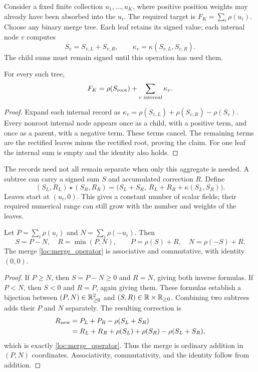 Consider a fixed finite collection $u_1,\ldots,u_K$, where positive
position weights may already have been absorbed into the $u_i$. The required
target is $F_K=\sum_i\rho(u_i)$. Choose any binary merge tree. Each leaf
retains its signed value; each internal node $v$ computes
\[
 S_v=S_{v,L}+S_{v,R},\qquad
 \kappa_v=\kappa(S_{v,L},S_{v,R}).
\]
The child sums must remain signed until this operation has used them.

\begin{theorem}
\label{loc:telescoping}
For every such tree,
\begin{equation}
 F_K=\rho(S_{\rm root})+
          \sum_{v\text{ internal}}\kappa_v.
 \label{loc:telescope_equation}
\end{equation}
\end{theorem}
\begin{proof}
Expand each internal record as
$\kappa_v=\rho(S_{v,L})+\rho(S_{v,R})-\rho(S_v)$.
Every nonroot internal node appears once as a child, with a positive term,
and once as a parent, with a negative term. These terms cancel. The remaining
terms are the rectified leaves minus the rectified root, proving the claim.
For one leaf the internal sum is empty and the identity also holds.
\end{proof}

The records need not all remain separate when only this aggregate is needed.
A subtree can carry a signed sum $S$ and accumulated correction $R$. Define
\begin{equation}
 (S_L,R_L)\star(S_R,R_R)=
 \bigl(S_L+S_R,\ R_L+R_R+\kappa(S_L,S_R)\bigr).
 \label{loc:merge_operator}
\end{equation}
Leaves start at $(u_i,0)$. This gives a constant number of scalar fields;
their required numerical range can still grow with the number and weights
of the leaves.

\begin{proposition}
\label{loc:mass_coordinates}
Let $P=\sum_i\rho(u_i)$ and $N=\sum_i\rho(-u_i)$. Then
\begin{equation}
 S=P-N,\quad R=\min(P,N),\qquad
 P=\rho(S)+R,\quad N=\rho(-S)+R.
 \label{loc:mass_inverse}
\end{equation}
The merge \eqref{loc:merge_operator} is associative and commutative, with
identity $(0,0)$.
\end{proposition}
\begin{proof}
If $P\ge N$, then $S=P-N\ge0$ and $R=N$, giving both inverse formulas.
If $P<N$, then $S<0$ and $R=P$, again giving them. These formulas establish a
bijection between $(P,N)\in\mathbb R_{\ge0}^2$ and $(S,R)\in\mathbb R\times\mathbb R_{\ge0}$.
Combining two subtrees adds their $P$ and $N$ separately. The resulting
correction is
\begin{align*}
 R_{\rm new}
 &=P_L+P_R-\rho(S_L+S_R)\\
 &=R_L+R_R+\rho(S_L)+\rho(S_R)-\rho(S_L+S_R),
\end{align*}
which is exactly \eqref{loc:merge_operator}. Thus the merge is ordinary
addition in $(P,N)$ coordinates. Associativity, commutativity, and the
identity follow from addition.
\end{proof}

